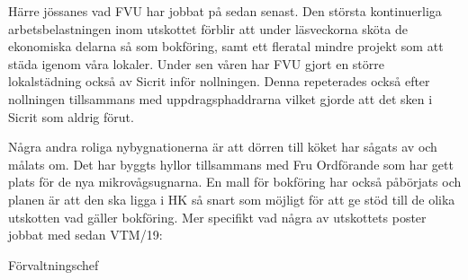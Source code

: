\documentclass[../_main/handlingar.tex]{subfiles}
\begin{document}
\vspace{8px}

Härre jössanes vad FVU har jobbat på sedan senast. Den största kontinuerliga arbetsbelastningen inom utskottet förblir att under läsveckorna sköta de ekonomiska delarna så som bokföring, samt ett fleratal mindre projekt som att städa igenom våra lokaler. 
Under sen våren har FVU gjort en större lokalstädning också av Sicrit inför nollningen. Denna repeterades också efter nollningen tillsammans med uppdragsphaddrarna vilket gjorde att det sken i Sicrit som aldrig förut.

Några andra roliga nybygnationerna är att dörren till köket har sågats av och målats om. 
Det har byggts hyllor tillsammans med Fru Ordförande som har gett plats för de nya mikrovågsugnarna. En mall för bokföring har också påbörjats och planen är att den ska  ligga i HK så snart som möjligt för att ge stöd till de olika utskotten vad gäller bokföring. Mer specifikt vad några av utskottets poster jobbat med sedan VTM/19:


\begin{signatures}{1}
    \mvh
    \signature{Henrik Ramström}{Förvaltningschef}
\end{signatures}
\end{document}
